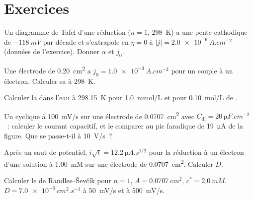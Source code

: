 \section{Exercices}

\begin{exercise}[$\star$]\label{exo:b3:electrode-kinetics:1}
Un diagramme de Tafel d'une réduction ($n = 1$, \qty{298}{K}) a une pente
cathodique de $-\qty{118}{mV}$
par décade et s'extrapole en $\eta = 0$ à $|j| = \qty{2.0e-6}{A.cm^{-2}}$
(données de l'exercice). Donner $\alpha$ et $j_0$.
\end{exercise}

\begin{exercise}[$\star$]\label{exo:b3:electrode-kinetics:2}
Une électrode de \qty{0.20}{cm^2} a $j_0 = \qty{1.0e-3}{A.cm^{-2}}$ pour
un couple à un électron. Calculer sa  à
\qty{298}{K}.
\end{exercise}

\begin{exercise}[$\star$]\label{exo:b3:electrode-kinetics:3}
Calculer la  dans l'eau à \qty{298.15}{K} pour
\qty{1.0}{mmol/L} et pour \qty{0.10}{mol/L}
de .
\end{exercise}

\begin{exercise}[$\star$]\label{exo:b3:electrode-kinetics:4}
Un  cyclique à \qty{100}{mV/s} sur une électrode de
\qty{0.0707}{cm^2} avec $C_{\mathrm{dl}} =
\qty{20}{\micro F.cm^{-2}}$~: calculer le courant capacitif, et le
comparer au pic faradique de
\qty{19}{\micro A} de la figure. Que se passe-t-il à \qty{10}{V/s}~?
\end{exercise}

\begin{exercise}[$\star\star$]\label{exo:b3:electrode-kinetics:5}
Après un saut de potentiel, $i\sqrt t = \qty{12.2}{\micro A.s^{1/2}}$
pour la réduction à un électron d'une solution à
\qty{1.00}{mM} sur une électrode de \qty{0.0707}{cm^2}. Calculer $D$.
\end{exercise}

\begin{exercise}[$\star\star$]\label{exo:b3:electrode-kinetics:6}
Calculer le  de Randles--Ševčík pour $n = 1$,
$A = \qty{0.0707}{cm^2}$, $c^* = \qty{2.0}{mM}$,
$D = \qty{7.0e-6}{cm^2.s^{-1}}$ à \qty{50}{mV/s} et à \qty{500}{mV/s}.
\end{exercise}

